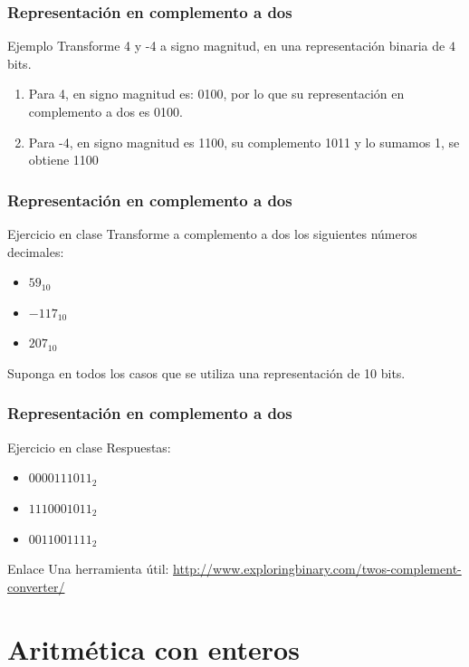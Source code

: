 \documentclass{beamer}
\begin{document}
\begin{frame}
	\frametitle{Representación en complemento a dos}
	\begin{exampleblock}{Ejemplo}
	Transforme 4 y -4 a signo magnitud, en una representación binaria de $4$ bits.
		\begin{enumerate}
			\item Para 4, en signo magnitud es: 0100, por lo que su representación en complemento a dos es 0100.
			\item Para -4, en signo magnitud es 1100, su complemento 1011 y lo sumamos 1, se obtiene 1100
		\end{enumerate}
	\end{exampleblock}
\end{frame}

\begin{frame}
	\frametitle{Representación en complemento a dos}
	\begin{block}{Ejercicio en clase}
	Transforme a complemento a dos los siguientes números decimales:
		\begin{itemize}
			\item $59_{10}$
			\item $-117_{10}$
			\item $207_{10}$
		\end{itemize}
	Suponga en todos los casos que se utiliza una representación de 10 bits.
	\end{block}	
\end{frame}

\begin{frame}
	\frametitle{Representación en complemento a dos}
	\begin{block}{Ejercicio en clase}
	Respuestas:
		\begin{itemize}
			\item $0000111011_{2}$
			\item $1110001011_{2}$
			\item $0011001111_{2}$
		\end{itemize}
	\end{block}
	\begin{block}{Enlace}
		Una herramienta útil: \url{http://www.exploringbinary.com/twos-complement-converter/}
	\end{block}		
\end{frame}


\section{Aritmética con enteros}
\end{document}
